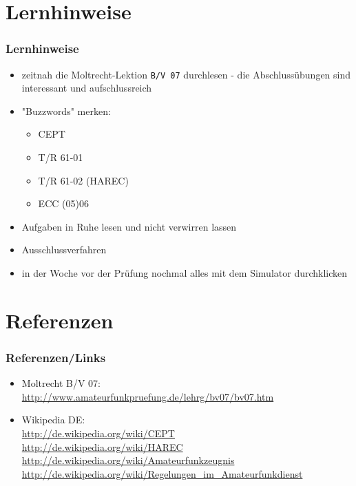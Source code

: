 \section{Lernhinweise}

\begin{frame}
    \frametitle{Lernhinweise}

    \begin{itemize}
        \item zeitnah die Moltrecht-Lektion \texttt{B/V 07} durchlesen - die
        Abschlussübungen sind interessant und aufschlussreich
        \item "Buzzwords" merken:
        \begin{itemize}
            \item CEPT
            \item T/R 61-01
            \item T/R 61-02 (HAREC)
            \item ECC (05)06
        \end{itemize}
        \item Aufgaben in Ruhe lesen und nicht verwirren lassen
        \item Ausschlussverfahren
        \item in der Woche vor der Prüfung nochmal alles mit dem Simulator durchklicken
    \end{itemize}

\end{frame}

\section{Referenzen}

\begin{frame}
    \frametitle{Referenzen/Links}
    
    \footnotesize
    \begin{itemize}
        \item Moltrecht B/V 07: \\
              \url{http://www.amateurfunkpruefung.de/lehrg/bv07/bv07.htm}
        \item Wikipedia DE: \\
              \url{http://de.wikipedia.org/wiki/CEPT} \\
              \url{http://de.wikipedia.org/wiki/HAREC} \\
              \url{http://de.wikipedia.org/wiki/Amateurfunkzeugnis} \\
              \url{http://de.wikipedia.org/wiki/Regelungen_im_Amateurfunkdienst} \\
    \end{itemize}

\end{frame}


